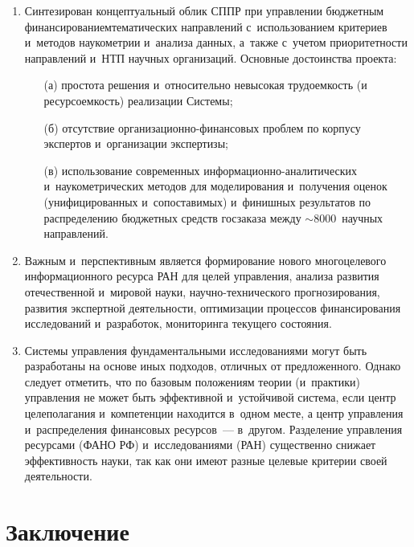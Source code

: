 \begin{multicols}{2}
    \noindent
    \begin{enumerate}[1.]
    \item  Синтезирован концептуальный облик СППР 
    при управ\-ле\-нии бюджетным финансированием\linebreak тематических 
направлений с~использованием критериев и~методов наукометрии и~анализа 
данных, а~также с~учетом приоритетности направлений  
и~НТП научных организаций. Основные 
достоинства проекта: 
\begin{itemize}
\item[(а)] простота решения и~относительно невысокая 
трудоемкость (и ресурсоемкость) реализации Системы; 
\item[(б)] отсутствие  
ор\-га\-ни\-за\-ци\-он\-но-фи\-нан\-со\-вых проблем по корпусу экспертов 
и~организации экспертизы; 
\item[(в)] использование современных  
ин\-фор\-ма\-ци\-он\-но-ана\-ли\-ти\-че\-ских и~наукометрических методов для 
моделирования и~получения оценок (унифицированных и~сопоставимых) 
и~финишных результатов по распределению бюджетных средств госзаказа 
между $\sim8000$~научных направлений.
\end{itemize}
    \item  Важным и~перспективным является формирование нового 
многоцелевого информационного ресурса РАН для целей управления, анализа 
развития отечественной и~мировой науки, на\-уч\-но-тех\-ни\-че\-ско\-го 
прогнозирования, развития экспертной деятельности, оптимизации процессов 
финансирования исследований и~разработок, мониторинга текущего состояния.
    \item  Системы управления фундаментальными исследованиями могут 
быть разработаны на основе иных подходов, отличных от предложенного. 
Однако следует отметить, что по базовым положениям теории (и~практики) 
управления не может быть эффективной и~устойчивой система, если центр 
целеполагания и~компетенции находится в~одном месте, а центр управления 
и~распределения финансовых ресурсов~--- в~другом. Разделение управления 
ресурсами (\mbox{ФАНО} РФ) и~исследованиями (РАН) существенно снижает 
эффективность науки, так как они имеют разные целевые критерии своей 
деятельности.
    \end{enumerate}
    
    \section{Заключение}
    

\end{multicols}
